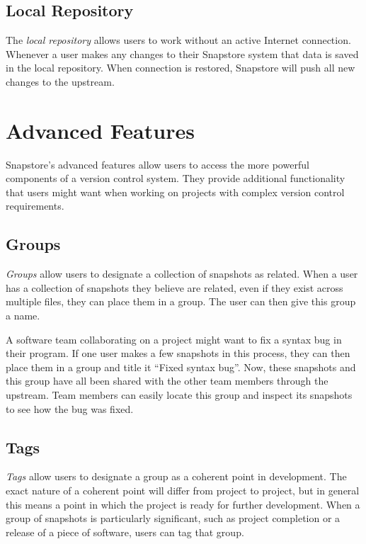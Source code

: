 \subsection{Local Repository}

The \textit{local repository} allows users to work without an active Internet connection. Whenever a user makes any changes to their Snapstore system that data is saved in the local repository. When connection is restored, Snapstore will push all new changes to the upstream.

\section{Advanced Features}

Snapstore's advanced features allow users to access the more powerful components of a version control system. They provide additional functionality that users might want when working on projects with complex version control requirements.

\subsection{Groups}

\textit{Groups} allow users to designate a collection of snapshots as related. When a user has a collection of snapshots they believe are related, even if they exist across multiple files, they can place them in a group. The user can then give this group a name.

A software team collaborating on a project might want to fix a syntax bug in their program. If one user makes a few snapshots in this process, they can then place them in a group and title it ``Fixed syntax bug''. Now, these snapshots and this group have all been shared with the other team members through the upstream. Team members can easily locate this group and inspect its snapshots to see how the bug was fixed. 

\subsection{Tags}

\textit{Tags} allow users to designate a group as a coherent point in development. The exact nature of a coherent point will differ from project to project, but in general this means a point in which the project is ready for further development. When a group of snapshots is particularly significant, such as project completion or a release of a piece of software, users can tag that group.


